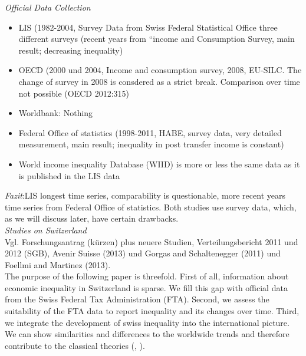 
\emph{Official Data Collection} \\

\begin{itemize}
\item  LIS (1982-2004, Survey Data from Swiss Federal Statistical Office three different surveys (recent years from “income and Consumption Survey, main result; decreasing inequality)
\item  OECD (2000 und 2004, Income and consumption survey, 2008, EU-SILC. The change of survey in 2008 is consdered as a strict break. Comparison over time not possible (OECD 2012:315)
\item  Worldbank: Nothing
\item  Federal Office of statistics (1998-2011, HABE, survey data, very detailed measurement, main result; inequality in post transfer income is constant)
\item  World income inequality Database (WIID) is more or less the same data as it is published in the LIS data
\end{itemize}
\emph{Fazit}:LIS longest time series, comparability is questionable, more recent years time series from Federal Office of statistics. Both studies use survey data, which, as we will discuss later, have certain drawbacks.\\

\emph{Studies on Switzerland} \\
Vgl. Forschungsantrag (kürzen) plus neuere Studien, Verteilungsbericht 2011 und 2012 (SGB), Avenir Suisse (2013) und Gorgas and Schaltenegger (2011) und Foellmi and Martinez (2013). \\


The purpose of the following paper is threefold. First of all, information about economic inequality in Switzerland is sparse. We  fill this gap with official data from the Swiss Federal Tax Administration (FTA). Second, we assess the suitability of the FTA data to report inequality and its changes over time. Third, we integrate the development of swiss inequality into the international picture. We can show similarities and differences to the worldwide trends and therefore contribute to the classical theories (\cite{kuznets1955economic}, \cite{nielsen_kuznets_1997}).

